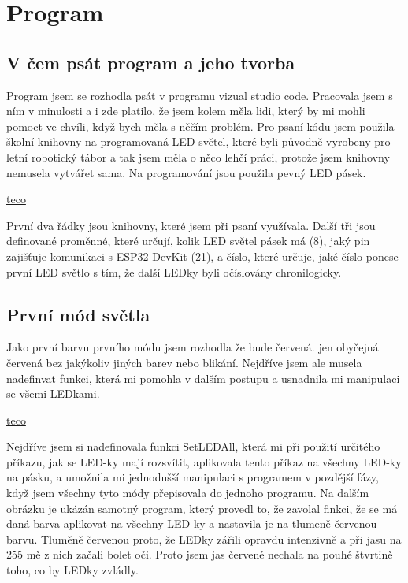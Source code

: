 \chapter{Program}

\section{V čem psát program a jeho tvorba}

Program jsem se rozhodla psát v programu vizual studio code. Pracovala jsem s ním v minulosti a i zde platilo, že jsem kolem měla lidi, který by mi mohli pomoct ve chvíli, když bych měla s něčím problém. Pro psaní kódu jsem použila školní knihovny na programovaná LED světel, které byli původně vyrobeny pro letní robotický tábor a tak jsem měla o něco lehčí práci, protože jsem knihovny nemusela vytvářet sama.  
Na programování jsou použila pevný LED pásek.


\href{https://www.tecomat.cz/products/}{teco}

%



První dva řádky jsou knihovny, které jsem při psaní využívala. Další tři jsou definované proměnné, které určují, kolik LED světel pásek má (8), jaký pin zajišťuje komunikaci s ESP32-DevKit (21), a číslo, které určuje, jaké číslo ponese první LED světlo s tím,  že další LEDky byli očíslovány chronilogicky.

\newpage

\section{První mód světla}
Jako první barvu prvního módu jsem rozhodla že bude červená. jen obyčejná červená bez jakýkoliv jiných barev nebo blikání. Nejdříve jsem ale musela nadefinvat funkci, která mi pomohla v dalším postupu a usnadnila mi manipulaci se všemi LEDkami. 


\href{https://www.tecomat.cz/products/}{teco}

%



Nejdříve jsem si nadefinovala funkci SetLEDAll, která mi při použití určitého příkazu, jak se LED-ky mají rozsvítit, aplikovala tento příkaz na všechny LED-ky na pásku, a umožnila mi jednodušší manipulaci s programem v pozdější fázy, když jsem všechny tyto módy přepisovala do jednoho programu. 
Na dalším obrázku je ukázán samotný program, který provedl to, že zavolal finkci, že se má daná barva aplikovat na všechny LED-ky a nastavila je na tlumeně červenou barvu. Tluměně červenou proto, že LEDky zářili opravdu intenzivně a při jasu na 255 mě z nich začali bolet oči. Proto jsem jas červené nechala na pouhé štvrtině toho, co by LEDky zvládly.

